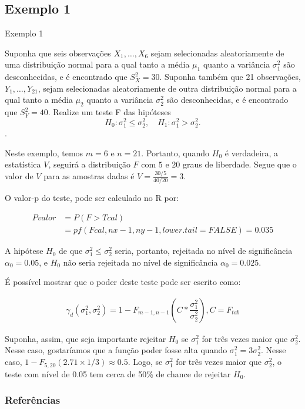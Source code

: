 \documentclass[12pt]{beamer}
\begin{document}
\subsection{Exemplo 1}
\begin{frame}{Exemplo 1}
\begin{block}{}
\justifying
Suponha que seis observações $X_1, \ldots, X_6$ sejam selecionadas aleatoriamente de uma distribuição normal para a qual tanto a média $\mu_1$ quanto a variância $\sigma^2_1$ são desconhecidas, e é encontrado que $S^2_X = 30$. Suponha também que 21 observações, $Y_1, \ldots, Y_{21}$, sejam selecionadas aleatoriamente de outra distribuição normal para a qual tanto a média $\mu_2$ quanto a variância $\sigma^2_2$ são desconhecidas, e é encontrado que $S^2_Y = 40$. Realize um teste F das hipóteses 
\[
H_0: \sigma^2_1 \leq \sigma^2_2, \quad H_1: \sigma^2_1 > \sigma^2_2.
\].

\end{block}
\end{frame}

\begin{frame}{}
\begin{block}{}
\justifying
Neste exemplo, temos $m = 6$ e $n = 21$. Portanto, quando $H_0$ é verdadeira, a estatística $V$, seguirá a distribuição $F$ com $5$ e $20$ graus de liberdade. Segue que o valor de $V$ para as amostras dadas é
$V = \frac{30/5}{40/20} = 3$.

O valor-p do teste, pode ser calculado no R por:

\begin{align*}
    Pvalor&=P(F>Tcal)\\
    &=pf(Fcal,nx-1,ny-1,lower.tail=FALSE)=0.035
\end{align*}

A hipótese $H_0$ de que $\sigma^2_1 \leq \sigma^2_2$ seria, portanto, rejeitada no nível de significância $\alpha_0 = 0.05$, e $H_0$ não seria rejeitada no nível de significância $\alpha_0 = 0.025$. 
\end{block}
\end{frame}

\begin{frame}{}
\begin{block}{}
\justifying
É possível mostrar que o poder deste teste pode ser escrito como:

\begin{align*}
    \gamma_{d}(\sigma_{1}^{2},\sigma_{2}^{2})=1-F_{m-1,n-1}(C*\dfrac{\sigma_{1}^{2}}{\sigma_{2}^{2}}), C=F_{tab}
\end{align*}

Suponha, assim, que seja importante rejeitar $H_0$ se $\sigma^2_1$ for três vezes maior que $\sigma^2_2$. Nesse caso, gostaríamos que a função poder fosse alta quando $\sigma^2_1 = 3\sigma^2_2$. Nesse caso, $1 - F_{5,20}(2.71 \times 1/3) \approx 0.5$. Logo, se $\sigma^2_1$ for três vezes maior que $\sigma^2_2$, o teste com nível de 0.05 tem cerca de 50\% de chance de rejeitar $H_0$.
\end{block}
\end{frame}

\begin{frame}[allowframebreaks]
\frametitle{\bf Referências}
\printbibliography
\end{frame}
\end{document}
